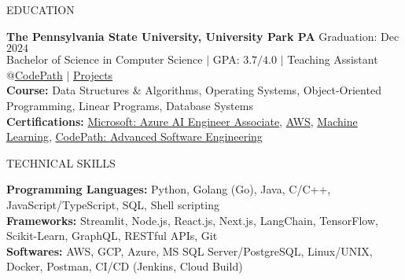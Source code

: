 \documentclass{resume} %
\begin{document}

\begin{rSection}{EDUCATION}

{\bf The Pennsylvania State University, University Park PA} \hfill {Graduation: Dec $2024$}\\
{Bachelor of Science in Computer Science} $\vert$ GPA: $3.7/4.0$ $\vert$ Teaching Assistant @\href{https://www.codepath.org/en-us/volunteers/technical-interview-coaching}{CodePath} $\vert$ \href{https://www.linkedin.com/in/harshitjain17/details/projects/}{Projects}\\
{\bf Course:} Data Structures \& Algorithms, Operating Systems, Object-Oriented Programming, Linear Programs, Database Systems \\
{\bf Certifications:} \href{https://learn.microsoft.com/api/credentials/share/en-us/harshitjain17/36D25FDF9BE21293?sharingId=87F1F438F3879B8C}{Microsoft: Azure AI Engineer Associate}, \href{https://www.coursera.org/account/accomplishments/verify/7L8L8YQTMCPZ}{AWS}, \href{https://www.coursera.org/account/accomplishments/verify/JYX5UB5YP4YD}{Machine Learning}, \href{https://www.linkedin.com/in/harshitjain17/details/education/}{CodePath: Advanced Software Engineering}
\end{rSection}


\begin{rSection}{TECHNICAL SKILLS}

{\bf Programming Languages:} Python, Golang (Go), Java, C/C++, JavaScript/TypeScript, SQL, Shell scripting\\
{\bf Frameworks:} Streamlit, Node.js, React.js, Next.js, LangChain, TensorFlow, Scikit-Learn, GraphQL, RESTful APIs, Git\\
{\bf Softwares:} AWS, GCP, Azure, MS SQL Server/PostgreSQL, Linux/UNIX, Docker, Postman, CI/CD (Jenkins, Cloud Build)

\end{rSection}

\end{document}
